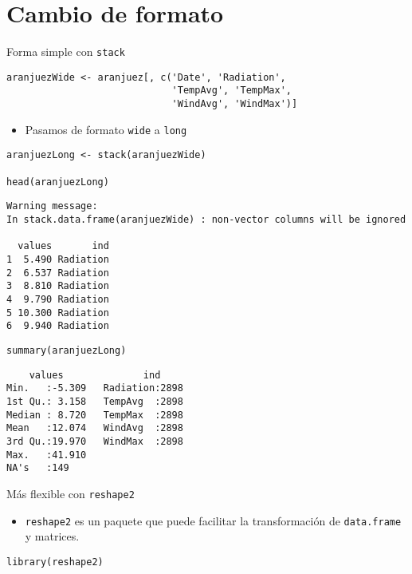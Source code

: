 \documentclass[aspectratio=169, usenames,svgnames,dvipsnames]{beamer}
\begin{document}
\section{Cambio de formato}
\label{sec:org34f484c}
\begin{frame}[label={sec:org8d3688d},fragile]{Forma simple con \texttt{stack}}
 \lstset{language=r,label= ,caption= ,captionpos=b,numbers=none}
\begin{lstlisting}
aranjuezWide <- aranjuez[, c('Date', 'Radiation',
                             'TempAvg', 'TempMax',
                             'WindAvg', 'WindMax')]
\end{lstlisting}

\begin{itemize}
\item Pasamos de formato \texttt{wide} a \texttt{long}
\end{itemize}
\lstset{language=r,label= ,caption= ,captionpos=b,numbers=none}
\begin{lstlisting}
aranjuezLong <- stack(aranjuezWide)

head(aranjuezLong)
\end{lstlisting}

\begin{verbatim}
Warning message:
In stack.data.frame(aranjuezWide) : non-vector columns will be ignored

  values       ind
1  5.490 Radiation
2  6.537 Radiation
3  8.810 Radiation
4  9.790 Radiation
5 10.300 Radiation
6  9.940 Radiation
\end{verbatim}

\lstset{language=r,label= ,caption= ,captionpos=b,numbers=none}
\begin{lstlisting}
summary(aranjuezLong)
\end{lstlisting}

\begin{verbatim}
    values              ind      
Min.   :-5.309   Radiation:2898  
1st Qu.: 3.158   TempAvg  :2898  
Median : 8.720   TempMax  :2898  
Mean   :12.074   WindAvg  :2898  
3rd Qu.:19.970   WindMax  :2898  
Max.   :41.910                   
NA's   :149
\end{verbatim}
\end{frame}

\begin{frame}[label={sec:org23fa577},fragile]{Más flexible con \texttt{reshape2}}
 \begin{itemize}
\item \texttt{reshape2} es un paquete que puede facilitar la transformación de \texttt{data.frame} y matrices.
\end{itemize}

\lstset{language=r,label= ,caption= ,captionpos=b,numbers=none}
\begin{lstlisting}
library(reshape2)
\end{lstlisting}
\end{frame}
\end{document}
